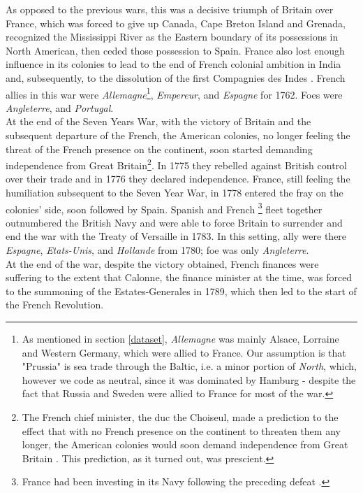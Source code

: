 \documentclass[12pt,a4paper,notitlepage,english]{article}
\begin{document}
\begin{appendix}
As opposed to the previous wars, this was a decisive triumph of Britain over France, which was forced to give up Canada, Cape Breton Island and Grenada, recognized the Mississippi River as the Eastern boundary of its possessions in North American, then ceded those possession to Spain.
France also lost enough influence in its colonies to lead to the end of French colonial ambition in India and, subsequently, to the dissolution of the first Compagnies des Indes \citep{Riley1986}.
French allies in this war were \textit{Allemagne}\footnote{As mentioned in section \ref{dataset}, \textit{Allemagne} was mainly Alsace, Lorraine and Western Germany, which were allied to France.
Our assumption is that "Prussia" is sea trade through the Baltic, i.e. a minor portion of \textit{North}, which, however we code as neutral, since it was dominated by Hamburg - despite the fact that Russia and Sweden were allied to France for most of the war.}, \textit{Empereur}, and \textit{Espagne} for 1762.
Foes were \textit{Angleterre}, and \textit{Portugal}. \\
At the end of the Seven Years War, with the victory of Britain and the subsequent departure of the French, the American colonies, no longer feeling the threat of the French presence on the continent, soon started demanding independence from Great Britain\footnote{The French chief minister, the duc the Choiseul, made a prediction to the effect that with no French presence on the continent to threaten them any longer, the American colonies would soon demand independence from Great Britain \citep{Findlay2007}.
This prediction, as it turned out, was prescient.}.
In 1775 they rebelled against British control over their trade and in 1776 they declared independence.
France, still feeling the humiliation subsequent to the Seven Year War, in 1778 entered the fray on the colonies' side, soon followed by Spain.
Spanish and French \footnote{France had been investing in its Navy following the preceding defeat \citep{Findlay2007}.} fleet together outnumbered the British Navy and were able to force Britain to surrender and end the war with the Treaty of Versaille in 1783.
In this setting, ally were there \textit{Espagne}, \textit{Etats-Unis}, and \textit{Hollande} from 1780; foe was only \textit{Angleterre}. \\
At the end of the war, despite the victory obtained, French finances were suffering to the extent that Calonne, the finance minister at the time, was forced to the summoning of the Estates-Generales in 1789, which then led to the start of the French Revolution.

\end{appendix}
\end{document}
